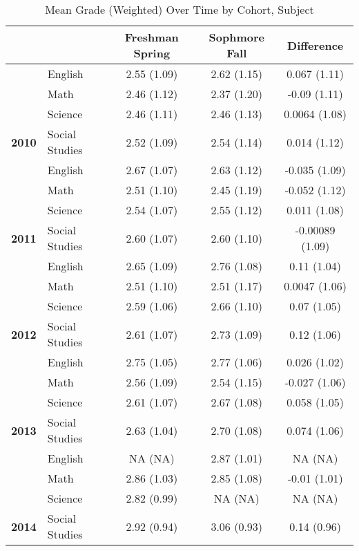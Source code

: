\begin{table}[!h]

\caption{\label{tab:table_grade_desc}Mean Grade (Weighted) Over Time by Cohort, Subject}
\centering
\begin{tabular}[t]{>{}llccc}
\toprule
 &  & Freshman Spring & Sophmore Fall & Difference\\
\midrule
 & English & 2.55 (1.09) & 2.62 (1.15) & 0.067 (1.11)\\

 & Math & 2.46 (1.12) & 2.37 (1.20) & -0.09 (1.11)\\

 & Science & 2.46 (1.11) & 2.46 (1.13) & 0.0064 (1.08)\\

\multirow{-4}{*}{\raggedright\arraybackslash \textbf{2010}} & Social Studies & 2.52 (1.09) & 2.54 (1.14) & 0.014 (1.12)\\
\cmidrule{1-5}
 & English & 2.67 (1.07) & 2.63 (1.12) & -0.035 (1.09)\\

 & Math & 2.51 (1.10) & 2.45 (1.19) & -0.052 (1.12)\\

 & Science & 2.54 (1.07) & 2.55 (1.12) & 0.011 (1.08)\\

\multirow{-4}{*}{\raggedright\arraybackslash \textbf{2011}} & Social Studies & 2.60 (1.07) & 2.60 (1.10) & -0.00089 (1.09)\\
\cmidrule{1-5}
 & English & 2.65 (1.09) & 2.76 (1.08) & 0.11 (1.04)\\

 & Math & 2.51 (1.10) & 2.51 (1.17) & 0.0047 (1.06)\\

 & Science & 2.59 (1.06) & 2.66 (1.10) & 0.07 (1.05)\\

\multirow{-4}{*}{\raggedright\arraybackslash \textbf{2012}} & Social Studies & 2.61 (1.07) & 2.73 (1.09) & 0.12 (1.06)\\
\cmidrule{1-5}
 & English & 2.75 (1.05) & 2.77 (1.06) & 0.026 (1.02)\\

 & Math & 2.56 (1.09) & 2.54 (1.15) & -0.027 (1.06)\\

 & Science & 2.61 (1.07) & 2.67 (1.08) & 0.058 (1.05)\\

\multirow{-4}{*}{\raggedright\arraybackslash \textbf{2013}} & Social Studies & 2.63 (1.04) & 2.70 (1.08) & 0.074 (1.06)\\
\cmidrule{1-5}
 & English & NA (NA) & 2.87 (1.01) & NA (NA)\\

 & Math & 2.86 (1.03) & 2.85 (1.08) & -0.01 (1.01)\\

 & Science & 2.82 (0.99) & NA (NA) & NA (NA)\\

\multirow{-4}{*}{\raggedright\arraybackslash \textbf{2014}} & Social Studies & 2.92 (0.94) & 3.06 (0.93) & 0.14 (0.96)\\
\bottomrule
\end{tabular}
\end{table}
